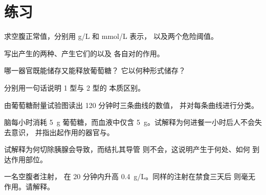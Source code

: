 \section{练习}

\begin{exercise}[$\star$]\label{exo:g12:glucose-and-diabetes:1}
求空腹正常值，分别用 \unit{g/L} 和 \unit{mmol/L} 表示，
以及两个危险阈值。
\end{exercise}

\begin{exercise}[$\star$]\label{exo:g12:glucose-and-diabetes:2}
写出产生的两种、产生它们的以及
各自对的作用。
\end{exercise}

\begin{exercise}[$\star$]\label{exo:g12:glucose-and-diabetes:3}
哪一器官既能储存又能释放葡萄糖？
它以何种形式储存？
\end{exercise}

\begin{exercise}[$\star$]\label{exo:g12:glucose-and-diabetes:4}
分别用一句话说明 1 型与 2 型的
本质区别。
\end{exercise}

\begin{exercise}[$\star$]\label{exo:g12:glucose-and-diabetes:5}
由葡萄糖耐量试验图读出 120 分钟时三条曲线的数值，
并对每条曲线进行分类。
\end{exercise}

\begin{exercise}[$\star\star$]\label{exo:g12:glucose-and-diabetes:6}
脑每小时消耗 \qty{5}{g} 葡萄糖，而血液中仅含
\qty{5}{g}。试解释为何进餐一小时后人不会失去意识，
并指出起作用的器官与。
\end{exercise}

\begin{exercise}[$\star\star$]\label{exo:g12:glucose-and-diabetes:7}
试解释为何切除胰腺会导致，而结扎其导管
则不会，这说明产生于何处、如何
到达作用部位。
\end{exercise}

\begin{exercise}[$\star\star$]\label{exo:g12:glucose-and-diabetes:8}
一名空腹者注射，
在 20 分钟内升高 \qty{0.4}{g/L}。同样的注射在禁食三天后
则毫无作用。请解释。
\end{exercise}

